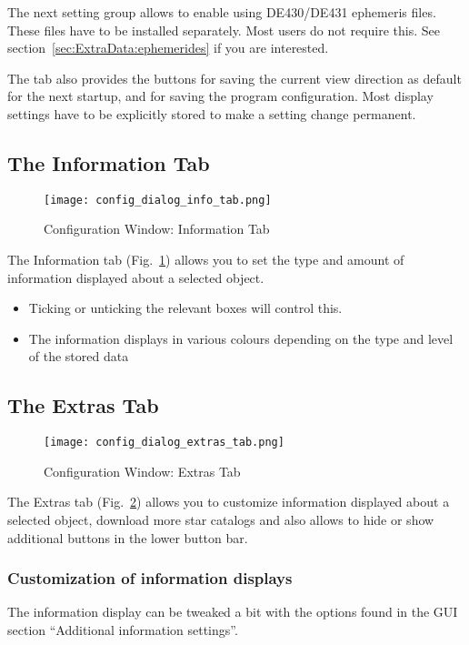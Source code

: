 The next setting group allows to enable using DE430/DE431 ephemeris files. 
These files have to be installed separately. Most users do not require this. 
See section~\ref{sec:ExtraData:ephemerides} if you are interested.

The tab also provides the buttons for saving the current view direction as default 
for the next startup, and for saving the program configuration. 
Most display settings have to be explicitly stored to make a setting change permanent.

\subsection{The Information Tab}
\label{sec:gui:configuration:info}

\begin{figure}[htbp]
\centering\texttt{[image: config\_dialog\_info\_tab.png]}
\caption{Configuration Window: Information Tab}
\label{fig:gui:configuration:info}
\end{figure}

The Information tab (Fig.~\ref{fig:gui:configuration:info}) allows you to set the type and amount of information
displayed about a selected object.
\begin{itemize}
\item Ticking or unticking the relevant boxes will control this.
\item The information displays in various colours depending on the type and
level of the stored data
\end{itemize}

\subsection{The Extras Tab}
\label{sec:gui:configuration:extras}

\begin{figure}[htbp]
\centering\texttt{[image: config\_dialog\_extras\_tab.png]}
\caption{Configuration Window: Extras Tab}
\label{fig:gui:configuration:extras}
\end{figure}

The Extras tab (Fig.~\ref{fig:gui:configuration:extras}) allows you to
customize information displayed about a selected object, download more
star catalogs and also allows to hide or show additional buttons in
the lower button bar. 
\subsubsection{Customization of information displays}
The information display can be tweaked a bit with the options found in the GUI section ``Additional information settings''.

